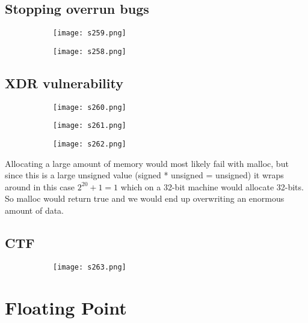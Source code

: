 \documentclass[8pt]{extreport}
\begin{document}
\section{Stopping overrun bugs}
\begin{figure}[H]
\centering
\begin{subfigure}[b]{0.4\linewidth}
\texttt{[image: s259.png]}
\end{subfigure}
\begin{subfigure}[b]{0.4\linewidth}
\texttt{[image: s258.png]}
\end{subfigure}
\end{figure}

\section{XDR vulnerability}
\begin{figure}[H]
\centering
\begin{subfigure}[b]{0.4\linewidth}
\texttt{[image: s260.png]}
\end{subfigure}
\begin{subfigure}[b]{0.4\linewidth}
\texttt{[image: s261.png]}
\end{subfigure}
\begin{subfigure}[b]{0.4\linewidth}
\texttt{[image: s262.png]}
\end{subfigure}
\end{figure}
Allocating a large amount of memory would most likely fail with malloc, but since this is a large unsigned value (signed * unsigned = unsigned) it wraps around in this case $2^20 + 1 = 1$ which on a 32-bit machine would allocate 32-bits. So malloc would return true and we would end up overwriting an enormous amount of data.

\section{CTF}
\begin{figure}[H]
\centering
\begin{subfigure}[b]{0.4\linewidth}
\texttt{[image: s263.png]}
\end{subfigure}
\end{figure}

\chapter{Floating Point}
\end{document}
